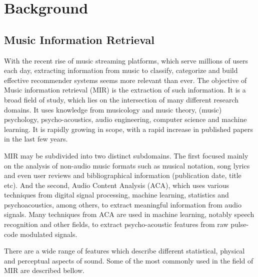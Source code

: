 \documentclass[a4paper, 12pt, twoside]{report}
\begin{document}
\newpage

\chapter{Background}
\label{sec:org4d1b31d}
\section{Music Information Retrieval}
\label{sec:orge32af72}

With the recent rise of music streaming platforms, which serve millions of users each day, extracting information from music to classify, categorize and build effective recommender systems seems more relevant than ever.
The objective of Music information retrieval (MIR) is the extraction of such information. It is a broad field of study, which lies on the intersection of many different research domains. It uses knowledge from musicology and music theory, (music) psychology, psycho-acoustics, audio engineering, computer science and machine learning. It is rapidly growing in scope, with a rapid increase in published papers in the last few years.

MIR may be subdivided into two distinct subdomains. The first focused mainly on the analysis of non-audio music formats such as musical notation, song lyrics and even user reviews and bibliographical information (publication date, title etc). And the second, Audio Content Analysis (ACA), which uses various techniques from digital signal processing, machine learning, statistics and psychoacoustics, among others, to extract meaningful information from audio signals. Many techniques from ACA are used in machine learning, notably speech recognition and other fields, to extract psycho-acoustic features from raw pulse-code modulated signals.

There are a wide range of features which describe different statistical, physical and perceptual aspects of sound. Some of the most commonly used in the field of MIR are described bellow.

\end{document}
